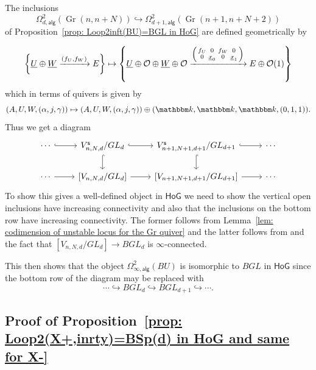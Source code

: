 \message{ !name(Bryan-Vakil.tex)}\documentclass{amsart}
\theoremstyle{definition}
\newcommand{\kk} {{\mathbbm k}}
\newcommand{\HoG}{\textsf{HoG}}
\newcommand{\OO}{\mathcal{O}}
\newcommand{\UL}[1]{\underline{#1}}
\newcommand{\alg}{\mathsf{alg}}
\newcommand{\stable}{\mathsf{s}}
\newcommand{\Gr}{\operatorname{Gr}}
\newcommand{\LoopTwo}{\Omega^{2}_{d,\alg}}
\begin{document}
The inclusions 
\[
\LoopTwo (\Gr (n,n+N))\hookrightarrow
\Omega^{2}_{d+1,\alg}(\Gr (n+1,n+N+2))
\]
of Proposition~\ref{prop:
Loop2inft(BU)=BGL in HoG} are defined geometrically by

\[
\left\{\UL{U}\oplus \UL{W}\xrightarrow{(f_{U},f_{W})}E \right\}\mapsto
\left\{\UL{U}\oplus \OO \oplus \UL{W}\oplus \OO
\xrightarrow{\begin{psmallmatrix}f_{U}&0&f_{W}&0\\ 0&\UL{x}_{0}&0& \UL{x}_{1}   \end{psmallmatrix}
}E\oplus \OO (1) \right\}
\]
which in terms of quivers is given by
\[
(A,U,W,(\alpha ,j,\gamma))\mapsto (A,U,W,(\alpha ,j, \gamma ))\oplus
(\kk ,\kk ,\kk ,(0,1,1)). 
\]
Thus we get a diagram
\[
\begin{tikzcd}
    \cdots \arrow[r, hook]
    & V^{\stable}_{n,N,d}/GL_{d} \arrow[r, hook] \arrow[d, hook]
    & V^{\stable}_{n+1,N+1,d+1}/GL_{d+1}  \arrow[r, hook] \arrow[d, hook] & \cdots \\
    \cdots \arrow[r]
    & \left[V_{n,N,d}/GL_{d} \right] \arrow[r]
    & \left[V_{n+1,N+1,d+1}/GL_{d+1} \right] 
\arrow[r] & \cdots
\end{tikzcd}
\]
To show this gives a well-defined object in $\HoG$ we need to show the
vertical open inclusions have increasing connectivity and also that
the inclusions on the bottom row have increasing connectivity. The
former follows from Lemma~\ref{lem: codimension of unstable locus for
the Gr quiver} and the latter follows from
\cite[Prop~2.2]{Larson-Vakil-BottPeriodicity} and the fact that
$\left[V_{n,N,d}/GL_{d} \right] \to BGL_{d}$ is
$\infty$-connected.


This then shows that the object $\Omega^{2}_{\infty ,\alg}(BU)$ is
isomorphic to $BGL$ in $\HoG$ since the bottom row of the diagram may
be replaced with 
\[
\dotsb \hookrightarrow BGL_{d}\hookrightarrow BGL_{d+1}\hookrightarrow \dotsb .
\]

\subsection{Proof of Proposition~\ref{prop: Loop2(X+,inrty)=BSp(d) in HoG and same
for X-}}
\end{document}
